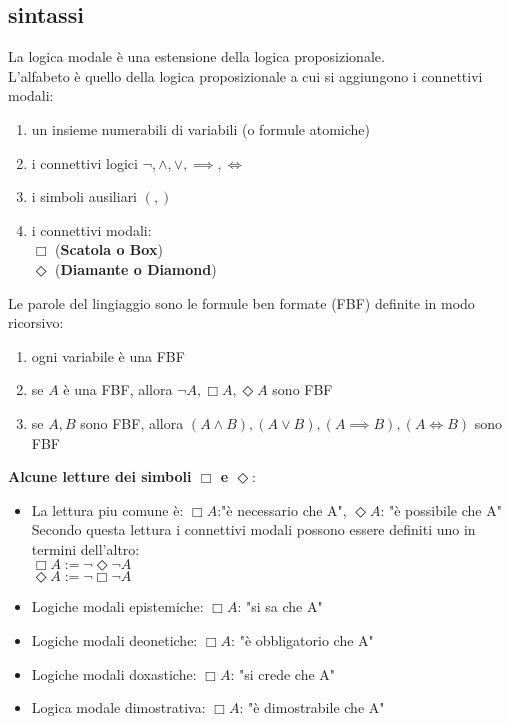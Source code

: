 \documentclass[a4paper,12pt]{article}
\theoremstyle{def}
\theoremstyle{prop}
\theoremstyle{esempio}
\theoremstyle{dimostrazione}
\theoremstyle{teo}
\theoremstyle{osservazione}
\begin{document}
\subsection{sintassi}
La logica modale è una estensione della logica proposizionale.\\
L'alfabeto è quello della logica proposizionale a cui si aggiungono i connettivi modali:
\begin{enumerate}
	\item un insieme numerabili di variabili (o formule atomiche)
	\item i connettivi logici \(\neg, \land, \lor, \implies, \iff\)
	\item i simboli ausiliari \((,)\)
	\item i connettivi modali:\\
	      \(\Box\) (\textbf{Scatola o Box})\\
	      \(\Diamond\) (\textbf{Diamante o Diamond})
\end{enumerate}
Le parole del lingiaggio sono le formule ben formate (FBF) definite in modo ricorsivo:\\
\begin{enumerate}
	\item ogni variabile è una FBF
	\item se \(A\) è una FBF, allora \(\neg A, \Box A, \Diamond A\) sono FBF
	\item se \(A,B\) sono FBF, allora \((A \land B), (A \lor B), (A \implies B), (A \iff B)\) sono FBF
\end{enumerate}
\textbf{Alcune letture dei simboli \(\Box\) e \(\Diamond\)}:\\
\begin{itemize}
	\item La lettura piu comune è: \(\Box A\):"è necessario che A", \(\Diamond A\): "è possibile che A"\\
	      Secondo questa lettura i connettivi modali possono essere definiti uno in termini dell'altro:\\
	      \(\Box A := \neg \Diamond \neg A\)\\
	      \(\Diamond A := \neg \Box \neg A\)
	\item Logiche modali epistemiche: \(\Box A\): "si sa che A"
	\item Logiche modali deonetiche: \(\Box A\): "è obbligatorio che A"
	\item Logiche modali doxastiche: \(\Box A\): "si crede che A"
	\item Logica modale dimostrativa: \(\Box A\): "è dimostrabile che A"
\end{itemize}
\end{document}
